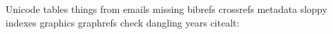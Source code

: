 Unicode
tables 
things from emails
missing bibrefs
crossrefs
metadata
sloppy
indexes
graphics 
graphrefs
check dangling years 
citealt: